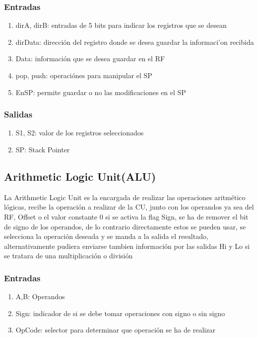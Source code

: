 \documentclass{article}
\begin{document}
            \subsubsection{Entradas}
            \begin{enumerate}
                \item dirA, dirB: entradas de 5 bits para indicar los registros que se desean
                \item dirData: direcci\'on del registro donde se desea guardar la informaci'on recibida
                \item Data: informaci\'on que se desea guardar en el RF
                \item pop, push: operaci\'ones para manipular el SP
                \item EnSP: permite guardar o no las modificaciones en el SP
            \end{enumerate}
            \subsubsection{Salidas}
            \begin{enumerate}
                \item S1, S2: valor de los registros seleccionados
                \item SP: Stack Pointer
            \end{enumerate}

        \subsection{Arithmetic Logic Unit(ALU)}
        \label{sec:ALU}        
            La Arithmetic Logic Unit es la encargada de realizar las operaciones aritm\'etico l\'ogicas, recibe la operaci\'on a realizar de la CU, junto con los operandos ya sea del RF, Offset o el valor constante 0
             si se activa la flag Sign, se ha de remover el bit de signo de los operandos, de lo contrario directamente estos se pueden usar, se selecciona la operaci\'on deseada y se manda a la salida el resultado, alternativamente pudiera enviarse tambien 
             informaci\'on por las salidas Hi y Lo si se tratara de una multiplicaci\'on o divisi\'on
            \subsubsection{Entradas}
            \begin{enumerate}
                \item A,B: Operandos
                \item Sign: indicador de si se debe tomar operaciones con signo o sin signo
                \item OpCode: selector para determinar que operaci\'on se ha de realizar
            \end{enumerate}
\end{document}
